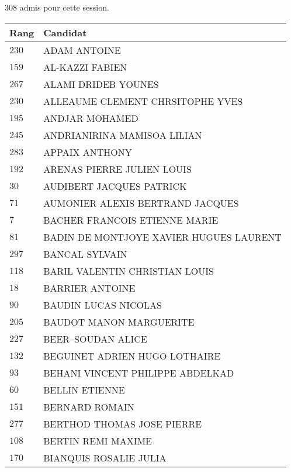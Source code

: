 



  $308$ admis pour cette session.

  \begin{xltabular}{\linewidth}{|l|X|}
    \hline
    \textbf{Rang} & \textbf{Candidat} \\
    \hline
    $230$ & ADAM ANTOINE \\
    \hline
    $159$ & AL-KAZZI FABIEN \\
    \hline
    $267$ & ALAMI DRIDEB YOUNES \\
    \hline
    $230$ & ALLEAUME CLEMENT CHRSITOPHE YVES \\
    \hline
    $195$ & ANDJAR MOHAMED \\
    \hline
    $245$ & ANDRIANIRINA MAMISOA LILIAN \\
    \hline
    $283$ & APPAIX ANTHONY \\
    \hline
    $192$ & ARENAS PIERRE JULIEN LOUIS \\
    \hline
    $30$ & AUDIBERT JACQUES PATRICK \\
    \hline
    $71$ & AUMONIER ALEXIS BERTRAND JACQUES \\
    \hline
    $7$ & BACHER FRANCOIS ETIENNE MARIE \\
    \hline
    $81$ & BADIN DE MONTJOYE XAVIER HUGUES LAURENT \\
    \hline
    $297$ & BANCAL SYLVAIN \\
    \hline
    $118$ & BARIL VALENTIN CHRISTIAN LOUIS \\
    \hline
    $18$ & BARRIER ANTOINE \\
    \hline
    $90$ & BAUDIN LUCAS NICOLAS \\
    \hline
    $205$ & BAUDOT MANON MARGUERITE \\
    \hline
    $227$ & BEER--SOUDAN ALICE \\
    \hline
    $132$ & BEGUINET ADRIEN HUGO LOTHAIRE \\
    \hline
    $93$ & BEHANI VINCENT PHILIPPE ABDELKAD \\
    \hline
    $60$ & BELLIN ETIENNE \\
    \hline
    $151$ & BERNARD ROMAIN \\
    \hline
    $277$ & BERTHOD THOMAS JOSE PIERRE \\
    \hline
    $108$ & BERTIN REMI MAXIME \\
    \hline
    $170$ & BIANQUIS ROSALIE JULIA \\

\end{xltabular}
